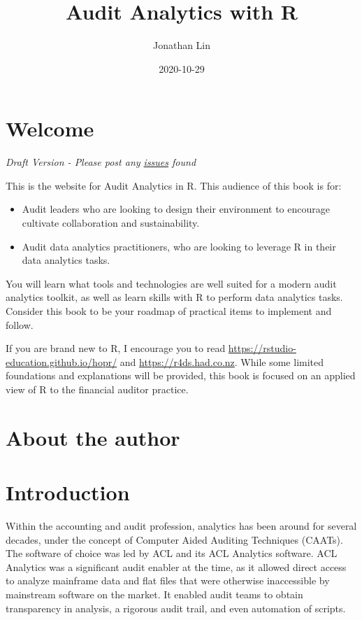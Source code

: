 \documentclass[
]{book}
\title{Audit Analytics with R}
\author{Jonathan Lin}
\date{2020-10-29}
\providecommand{\tightlist}{%
  \setlength{\itemsep}{0pt}\setlength{\parskip}{0pt}}
\begin{document}
\maketitle

{
\setcounter{tocdepth}{1}
\tableofcontents
}
\hypertarget{welcome}{%
\chapter*{Welcome}\label{welcome}}

\emph{Draft Version - Please post any \href{https://github.com/jonlinca/auditanalytics/issues}{issues} found}

This is the website for Audit Analytics in R. This audience of this book is for:

\begin{itemize}
\tightlist
\item
  Audit leaders who are looking to design their environment to encourage cultivate collaboration and sustainability.
\item
  Audit data analytics practitioners, who are looking to leverage R in their data analytics tasks.
\end{itemize}

You will learn what tools and technologies are well suited for a modern audit analytics toolkit, as well as learn skills with R to perform data analytics tasks. Consider this book to be your roadmap of practical items to implement and follow.

If you are brand new to R, I encourage you to read \url{https://rstudio-education.github.io/hopr/} and \url{https://r4ds.had.co.nz}. While some limited foundations and explanations will be provided, this book is focused on an applied view of R to the financial auditor practice.

\hypertarget{about-the-author}{%
\chapter*{About the author}\label{about-the-author}}

\hypertarget{intro}{%
\chapter{Introduction}\label{intro}}

Within the accounting and audit profession, analytics has been around for several decades, under the concept of Computer Aided Auditing Techniques (CAATs). The software of choice was led by ACL and its ACL Analytics software. ACL Analytics was a significant audit enabler at the time, as it allowed direct access to analyze mainframe data and flat files that were otherwise inaccessible by mainstream software on the market. It enabled audit teams to obtain transparency in analysis, a rigorous audit trail, and even automation of scripts.
\end{document}
